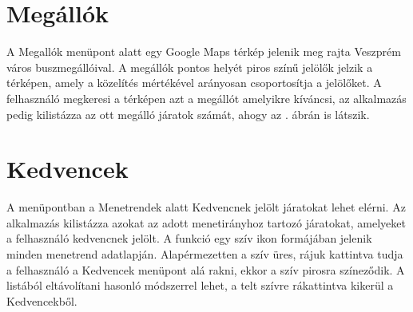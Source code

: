 \section {Megállók}
\label {megallok}
A Megallók menüpont alatt egy Google Maps térkép jelenik meg rajta Veszprém város buszmegállóival.
A megállók pontos helyét piros színű jelölők jelzik a térképen, amely a közelítés mértékével arányosan csoportosítja a jelölőket.
A felhasználó megkeresi a térképen azt a megállót amelyikre kíváncsi, az alkalmazás pedig kilistázza az ott megálló járatok számát, ahogy az . ábrán is látszik.

\section {Kedvencek}
\label {kedvencek}
A menüpontban a Menetrendek alatt Kedvencnek jelölt járatokat lehet elérni.
Az alkalmazás kilistázza azokat az adott menetirányhoz tartozó járatokat, amelyeket a felhasználó kedvencnek jelölt.
A funkció egy szív ikon formájában jelenik minden menetrend adatlapján.
Alapérmezetten a szív üres, rájuk kattintva tudja a felhasználó a Kedvencek menüpont alá rakni, ekkor a szív pirosra színeződik.
A listából eltávolítani hasonló módszerrel lehet, a telt szívre rákattintva kikerül a Kedvencekből.

